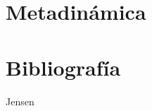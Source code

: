 \documentclass [11pt]{article}
\begin{document}
\section{Metadinámica}






























 


















\vspace{10 cm}
\section{Bibliografía}

Jensen













\vspace{20 cm}
\nocite{*}


\end{document}

